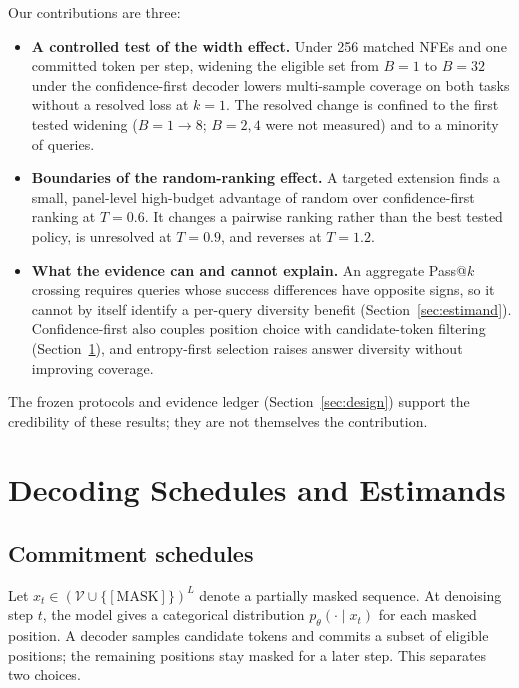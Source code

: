 \documentclass[11pt]{article}
\begin{document}
Our contributions are three:
\begin{itemize}
  \item \textbf{A controlled test of the width effect.} Under 256 matched NFEs and one committed token per step, widening the eligible set from $B=1$ to $B=32$ under the confidence-first decoder lowers multi-sample coverage on both tasks without a resolved loss at $k=1$. The resolved change is confined to the first tested widening ($B=1\rightarrow8$; $B=2,4$ were not measured) and to a minority of queries.
  \item \textbf{Boundaries of the random-ranking effect.} A targeted extension finds a small, panel-level high-budget advantage of random over confidence-first ranking at $T=0.6$. It changes a pairwise ranking rather than the best tested policy, is unresolved at $T=0.9$, and reverses at $T=1.2$.
  \item \textbf{What the evidence can and cannot explain.} An aggregate Pass@$k$ crossing requires queries whose success differences have opposite signs, so it cannot by itself identify a per-query diversity benefit (Section~\ref{sec:estimand}). Confidence-first also couples position choice with candidate-token filtering (Section~\ref{sec:setup}), and entropy-first selection raises answer diversity without improving coverage.
\end{itemize}
The frozen protocols and evidence ledger (Section~\ref{sec:design}) support the credibility of these results; they are not themselves the contribution.

\section{Decoding Schedules and Estimands}
\label{sec:setup}

\subsection{Commitment schedules}

Let $x_t\in(\mathcal{V}\cup\{[\mathrm{MASK}]\})^L$ denote a partially masked sequence. At denoising step $t$, the model gives a categorical distribution $p_\theta(\cdot\mid x_t)$ for each masked position. A decoder samples candidate tokens and commits a subset of eligible positions; the remaining positions stay masked for a later step. This separates two choices.
\end{document}
